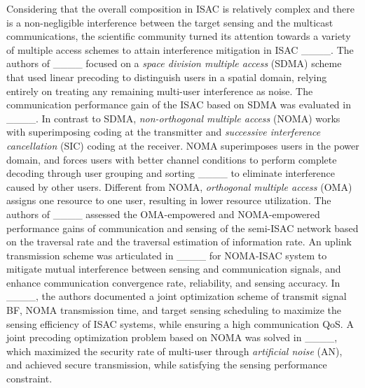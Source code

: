  Considering that the overall composition in ISAC is relatively complex and there is a non-negligible interference between the target sensing and the multicast communications, the scientific community turned its attention towards a variety of multiple access schemes to attain interference mitigation in ISAC ____. The authors of ____ focused on a \emph{space division multiple access} (SDMA) scheme that used linear precoding to distinguish users in a spatial domain, relying entirely on treating any remaining multi-user interference as noise. The communication performance gain of the ISAC based on SDMA was evaluated in ____. In contrast to SDMA, \emph{non-orthogonal multiple access} (NOMA) works with superimposing coding at the transmitter and \emph{successive interference cancellation} (SIC) coding at the receiver. NOMA superimposes users in the power domain, and forces users with better channel conditions to perform complete decoding through user grouping and sorting ____ to eliminate interference caused by other users. Different from NOMA, \emph{orthogonal multiple access} (OMA) assigns one resource to one user, resulting in lower resource utilization. 
The authors of ____ assessed the OMA-empowered and NOMA-empowered performance gains of communication and sensing of the semi-ISAC network based on the traversal rate and the traversal estimation of information rate. An uplink transmission scheme was articulated in ____ for NOMA-ISAC system to mitigate mutual interference between sensing and communication signals, and enhance communication convergence rate, reliability, and sensing accuracy. In ____, the authors documented a joint optimization scheme of transmit signal BF, NOMA transmission time, and target sensing scheduling to maximize the sensing efficiency of ISAC systems, while ensuring a high communication QoS. 
A joint precoding optimization problem based on NOMA was solved in ____, which maximized the security rate of multi-user through \emph{artificial noise} (AN), and achieved secure transmission, while satisfying the sensing performance constraint. 

